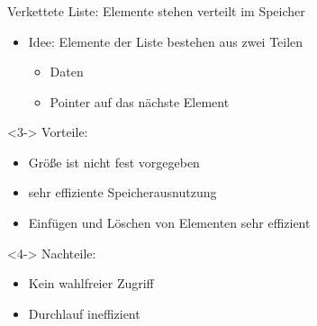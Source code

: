 \begin{frame}
\frametitle{\insertsection}
\begin{block}
{Verkettete Liste: Elemente stehen verteilt im Speicher}
\begin{itemize}
	\item<2-> Idee: Elemente der Liste bestehen aus zwei Teilen
	\begin{itemize}
		\item Daten
		\item Pointer auf das nächste Element
	\end{itemize}
\end{itemize}
\end{block}
\begin{block}<3->
{Vorteile:}
\begin{itemize}
	\item Größe ist nicht fest vorgegeben
	\item sehr effiziente Speicherausnutzung
	\item Einfügen und Löschen von Elementen sehr effizient
\end{itemize}
\end{block}
\begin{block}<4->
{Nachteile:}
\begin{itemize}
	\item Kein wahlfreier Zugriff
	\item Durchlauf ineffizient
\end{itemize}
\end{block}
\end{frame}


